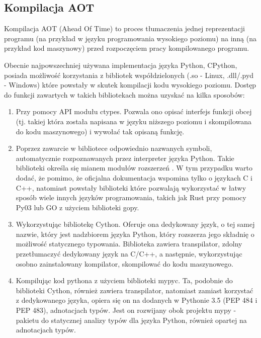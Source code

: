 \documentclass[11pt, a4paper]{article}
\begin{document}
\begin{sloppypar}
    \subsection{Kompilacja AOT}
    Kompilacja AOT (Ahead Of Time) to proces tłumaczenia jednej reprezentacji programu (na
    przykład w języku programowania wysokiego poziomu) na inną (na przykład kod
    maszynowy) przed rozpoczęciem pracy kompilowanego programu.

    Obecnie najpowszechniej używana implementacja języka Python, CPython, posiada możliwość
    korzystania z bibliotek współdzielonych (.so - Linux, .dll/.pyd - Windows) które powstały
    w skutek kompilacji kodu wysokiego poziomu. Dostęp do funkcji zawartych w takich
    bibliotekach można uzyskać na kilka sposobów:

    \begin{enumerate}
      \item Przy pomocy API modułu ctypes\cite{Python_ctypes}. Pozwala ono opisać interfejs
        funkcji obcej (tj. takiej która została napisana w języku niższego poziomu i skompilowana
        do kodu maszynowego) i wywołać tak opisaną funkcję.

      \item Poprzez zawarcie w bibliotece odpowiednio nazwanych symboli, automatycznie
        rozpoznawanych przez interpreter języka Python. Takie biblioteki określa się mianem
        modułów rozszerzeń \cite{Extending_Python_With_C_Cpp}. W tym przypadku warto
        dodać, że pomimo, że oficjalna dokumentacja wspomina tylko o językach C i C++, natomiast
        powstały biblioteki które pozwalają wykorzystać w łatwy sposób wiele innych języków
        programowania, takich jak Rust przy pomocy Py03\cite{PyO3} lub GO z użyciem biblioteki
        gopy\cite{gopy}.

      \item Wykorzystując bibliotekę Cython\cite{Cython_Org}\cite{Cython_The_Best_Of_Both}.
        Oferuje ona dedykowany język, o tej samej nazwie, który jest nadzbiorem języka
        Python, który rozszerza jego składnię o możliwość statycznego typowania.
        Biblioteka zawiera transpilator, zdolny przetłumaczyć dedykowany język na C/C++,
        a następnie, wykorzystując osobno zainstalowany kompilator, skompilować do kodu
        maszynowego.

      \item Kompilując kod pythona z użyciem biblioteki mypyc\cite{mypyc}. Ta, podobnie
        do biblioteki Cython, również zawiera transpilator, natomiast zamiast korzystać
        z dedykowanego języka, opiera się on na dodanych w Pythonie 3.5\cite{Python_3_5}
        (PEP 484\cite{PEP_484} i PEP 483\cite{PEP_483}), adnotacjach typów. Jest on
        rozwijany obok projektu mypy - pakietu do statycznej analizy typów dla języka
        Python, również opartej na adnotacjach typów\cite{mypy}.
    \end{enumerate}


\end{sloppypar}
\end{document}
